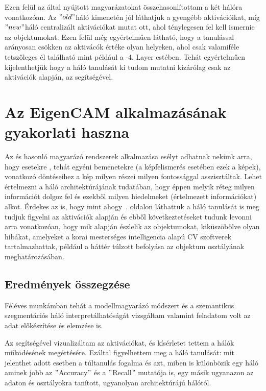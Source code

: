 \documentclass[12pt,oneside,a4paper]{article}
\newcommand{\newsection}[1]{\clearpage\section{#1}}\label{makro}
\theoremstyle{remark}
\newcommand{\oldh}{\( "old" \)}\label{makro2}
\newcommand{\newh}{\( "new" \)}
\begin{document}
Ezen felül az  által nyújtott magyarázatokat összehasonlítottam a két hálóra vonatkozóan.
Az \oldh háló kimenetén jól láthatjuk a gyengébb aktivációikat, míg \newh háló centralizált aktivációkat mutat ott, ahol
ténylegesen fel kell ismernie az objektumokat.
Ezen felül még egyértelműen látható, hogy a tanulással arányosan csökken az aktivácók értéke olyan helyeken, ahol csak valamiféle
tetszőleges él található mint például a -4. Layer estében.
Tehát egyértelműen kijelenthetjük hogy a háló tanulását ki tudom mutatni kizárólag csak az aktivációk alapján, az
 segítségével.

\newsection{Az EigenCAM alkalmazásának gyakorlati haszna}\label{sec:az-eigencam-alkalmazasanak-gyakorlati-haszna}
    Az  és hasonló magyarázó rendszerek alkalmazása esélyt adhatnak nekünk arra, hogy esetekre
    , tehát egyéni bemenetekre (a képfelismerés esetében ezek a képek), vonatkozó döntéseihez a kép milyen részei
    milyen fontossággal asszisztáltak.
    Lehet értelmezni a háló architektúrájának tudatában, hogy éppen melyik réteg milyen információt dolgoz fel
    és ezekből milyen hiedelmeket (értelmezett információkat) alkot.
    Érdekes az is, hogy mint ahogy~\pageref{subsec:magyarazat}. oldalon láthattuk a háló tanulását is meg tudjuk
    figyelni az aktivációk alapján és ebből következtetéseket tudunk levonni arra vonatkozóan, hogy mik alapján észlelik
    az objektumokat, kiküszöbölve olyan hibákat, amelyeket a korai mesterséges intelligencia  alapú
    \ac{CV} szoftverek tartalmazhattak, például a háttér túlzott befolyása az objektum osztályának meghatározásában.

\subsection{Eredmények összegzése}\label{subsec:osszegzes-es-kovetkeztetes}
    Féléves munkámban tehát a  modellmagyarázó módszert és a 
    szemantikus szegmentációs háló interpretálhatóságát vizsgáltam valamint feladatom volt az adat előkészítése és elemzése is.

    Az  segítségével vizualizáltam az aktivációkat, és kísérletet tettem a hálók működésének megértésére.
    Ezáltal figyelhettem meg a háló tanulását: mit jelenthet adott esetben a túltanulás fogalma és azt, miben is
    különbözik egy háló aminek jobb az \("\)Accuracy\("\) és a \("\)Recall\("\) mutatója is, egy másik ugyanazon az adaton és
    osztályokra tanított, ugyanolyan architektúrájú hálótól.
\end{document}
